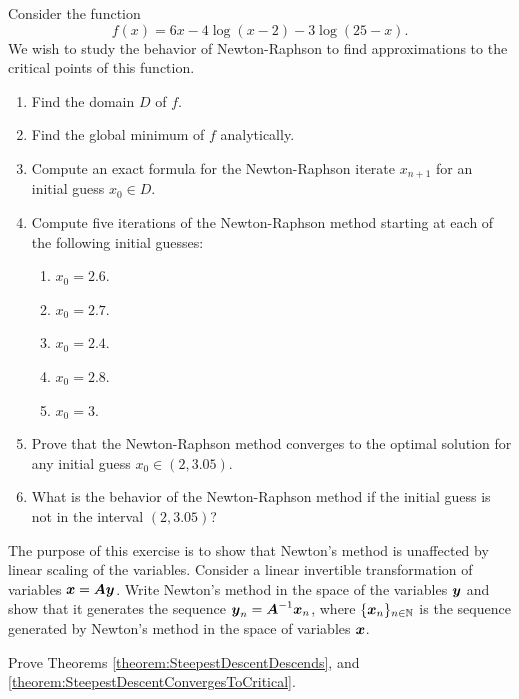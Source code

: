 \begin{problem}
Consider the function 
\begin{equation*}
f(x) = 6x -4\log(x-2) -3\log(25-x).
\end{equation*}
We wish to study the behavior of Newton-Raphson to find approximations to the critical points of this function.
\begin{enumerate}
	\item Find the domain $D$ of $f$.
	\item Find the global minimum of $f$ analytically. 
	\item Compute an exact formula for the Newton-Raphson iterate $x_{n+1}$ for an initial guess $x_0 \in D$.
	\item Compute five iterations of the Newton-Raphson method starting at each of the following initial guesses:
	\begin{enumerate}
		\item $x_0 = 2.6$.
		\item $x_0 = 2.7$.
		\item $x_0 = 2.4$.
		\item $x_0 = 2.8$.
		\item $x_0 = 3$.
	\end{enumerate}
	\item Prove that the Newton-Raphson method converges to the optimal solution for any initial guess $x_0 \in (2,3.05)$.
	\item What is the behavior of the Newton-Raphson method if the initial guess is not in the interval $(2,3.05)$?
\end{enumerate}
\end{problem}

\begin{problem}[Advanced]\cite[p.91 \#1.4.1]{bertsekas1999nonlinear}
The purpose of this exercise is to show that Newton's method is unaffected by linear scaling of the variables.  Consider a linear invertible transformation of variables $\boldsymbol{x}=\boldsymbol{A}\boldsymbol{y}$.  Write Newton's method in the space of the variables $\boldsymbol{y}$ and show that it generates the sequence $\boldsymbol{y}_n = \boldsymbol{A}^{-1}\boldsymbol{x}_n$, where $\{ \boldsymbol{x}_n \}_{n \in \mathbb{N}}$ is the sequence generated by Newton's method in the space of variables $\boldsymbol{x}$.\
\end{problem}

\begin{problem}[Advanced]
Prove Theorems \ref{theorem:SteepestDescentDescends}, and \ref{theorem:SteepestDescentConvergesToCritical}.
\end{problem}

